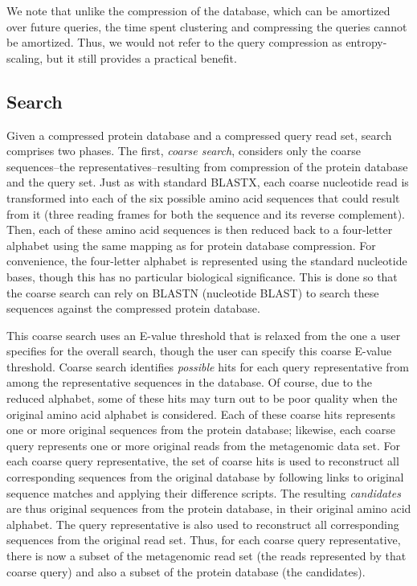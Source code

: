 \documentclass{amsbook}
\theoremstyle{definition}
\theoremstyle{remark}
\numberwithin{equation}{section}
\begin{document}
We note that unlike the compression of the database, which can be amortized 
over future queries, the time spent clustering and compressing the queries 
cannot be amortized.
Thus, we would not refer to the query compression as entropy-scaling, but it
still provides a practical benefit.

\subsection*{Search}

Given a compressed protein database and a compressed query read set, search
comprises two phases.
The first, \emph{coarse search}, considers only the coarse sequences--the
representatives--resulting from compression of the protein database and the
query set.
Just as with standard BLASTX, each coarse nucleotide read is transformed into 
each of the six possible amino acid sequences that could result from it (three 
reading frames for both the sequence and its reverse complement).
Then, each of these amino acid sequences is then reduced back to a four-letter
alphabet using the same mapping as for protein database compression.
For convenience, the four-letter alphabet is represented using the standard
nucleotide bases, though this has no particular biological significance.
This is done so that the coarse search can rely on BLASTN (nucleotide BLAST) to
search these sequences against the compressed protein database.

This coarse search uses an E-value threshold that is relaxed from the one a user
specifies for the overall search, though the user can specify this coarse 
E-value threshold.
Coarse search identifies \emph{possible} hits for each query representative from
among the representative sequences in the database.
Of course, due to the reduced alphabet, some of these hits may turn out to be
poor quality when the original amino acid alphabet is considered.
Each of these coarse hits represents one or more original sequences from the
protein database; likewise, each coarse query represents one or more original
reads from the metagenomic data set.
For each coarse query representative, the set of coarse hits is used to
reconstruct all corresponding sequences from the original database by following
links to original sequence matches and applying their difference scripts.
The resulting \emph{candidates} are thus original sequences from the protein
database, in their original amino acid alphabet.
The query representative is also used to reconstruct all corresponding sequences
from the original read set.
Thus, for each coarse query representative, there is now a subset of the
metagenomic read set (the reads represented by that coarse query) and also a
subset of the protein database (the candidates).
\end{document}
